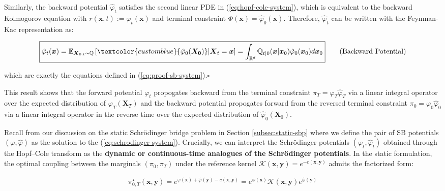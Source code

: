 \documentclass{article}
\newcommand{\bluetext}[1]{\textcolor{customblue}{#1}}
\begin{document}
Similarly, the backward potential $\hat\varphi_t$ satisfies the second linear PDE in (\ref{eq:hopf-cole-system}), which is equivalent to the backward Kolmogorov equation with $r(\boldsymbol{x},t):=\hat\varphi_t(\boldsymbol{x})$ and terminal constraint $\Phi(\boldsymbol{x})=\hat\varphi_0(\boldsymbol{x})$. Therefore, $\hat\varphi_t$ can be written with the Feynman-Kac representation as:
\begin{small}
\begin{align}
\boxed{\hat\varphi_t(\boldsymbol{x})=\mathbb{E}_{\boldsymbol{X}_{0:t}\sim \mathbb{Q}}\left[\bluetext{\hat\varphi_0(\boldsymbol{X_0})}|\boldsymbol{X}_t=\boldsymbol{x}\right]=\int_{\mathbb{R}^d}\mathbb{Q}_{t|0}(\boldsymbol{x}|\boldsymbol{x}_0)\hat\varphi_0(\boldsymbol{x}_0) d\boldsymbol{x}_0}\tag{Backward Potential}\label{eq:backward-potential-integral}
\end{align}
\end{small}
which are exactly the equations defined in (\ref{eq:proof-sb-system}).\hfill $\square$

This result shows that the forward potential $\varphi_t$ propogates backward from the terminal constraint $\pi_T= \varphi_T\hat\varphi_T$ via a linear integral operator over the expected distribution of $\varphi_T(\boldsymbol{X}_T)$ and the backward potential propogates forward from the reversed terminal constraint $\pi_0=\varphi_0\hat\varphi_0$ via a linear integral operator in the reverse time over the expected distribution of $\hat\varphi_0(\boldsymbol{X}_0)$.

Recall from our discussion on the static Schrödinger bridge problem in Section \ref{subsec:static-sbp} where we define the pair of SB potentials $(\varphi, \hat\varphi)$ as the solution to the (\ref{eq:schrodinger-system}). Crucially, we can interpret the Schrödinger potentials $(\varphi_t,\hat\varphi_t)$ obtained through the Hopf–Cole transform as the \textbf{dynamic or continuous-time analogues of the Schrödinger potentials}. In the static formulation, the optimal coupling between the marginals $(\pi_0, \pi_T)$ under the reference kernel $\mathcal{K}(\boldsymbol{x},\boldsymbol{y})=e^{-c(\boldsymbol{x},\boldsymbol{y})}$ admits the factorized form:
\begin{small}
\begin{align}
    \pi_{0,T}^\star(\boldsymbol{x},\boldsymbol{y})=e^{\varphi(\boldsymbol{x})+\hat{\varphi}(\boldsymbol{y})-c(\boldsymbol{x},\boldsymbol{y})}= e^{\varphi(\boldsymbol{x})}\mathcal{K}(\boldsymbol{x},\boldsymbol{y})e^{\hat{\varphi}(\boldsymbol{y})}\tag{Solution to Static SB}
\end{align}
\end{small}
\end{document}
